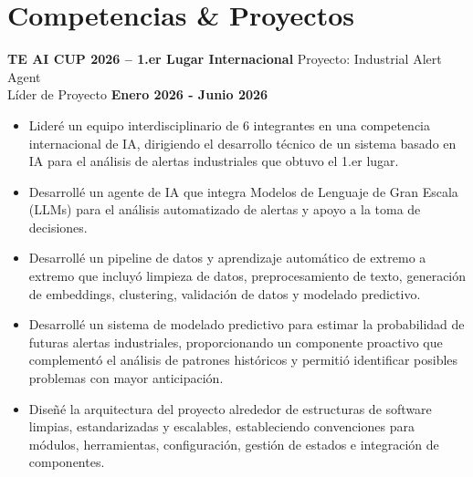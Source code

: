 \documentclass[11pt]{article}
\begin{document}
\section*{Competencias \& Proyectos}
\textbf{TE AI CUP 2026 -- 1.er Lugar Internacional} \hfill Proyecto: Industrial Alert Agent\\
Líder de Proyecto \hfill \textbf{Enero 2026 - Junio 2026}
\vspace{-0.3cm}
\begin{itemize}[leftmargin=*]
    \item Lideré un equipo interdisciplinario de 6 integrantes en una competencia internacional de IA, dirigiendo el desarrollo técnico de un sistema basado en IA para el análisis de alertas industriales que obtuvo el 1.er lugar. 

    \vspace{-0.3cm} 
    \item Desarrollé un agente de IA que integra Modelos de Lenguaje de Gran Escala (LLMs) para el análisis automatizado de alertas y apoyo a la toma de decisiones.

    \vspace{-0.3cm} 
    \item Desarrollé un pipeline de datos y aprendizaje automático de extremo a extremo que incluyó limpieza de datos, preprocesamiento de texto, generación de embeddings, clustering, validación de datos y modelado predictivo. 

    \vspace{-0.3cm}
    \item Desarrollé un sistema de modelado predictivo para estimar la probabilidad de futuras alertas industriales, proporcionando un componente proactivo que complementó el análisis de patrones históricos y permitió identificar posibles problemas con mayor anticipación.

    \vspace{-0.3cm} 
    \item Diseñé la arquitectura del proyecto alrededor de estructuras de software limpias, estandarizadas y escalables, estableciendo convenciones para módulos, herramientas, configuración, gestión de estados e integración de componentes. 
\end{itemize}
\end{document}

